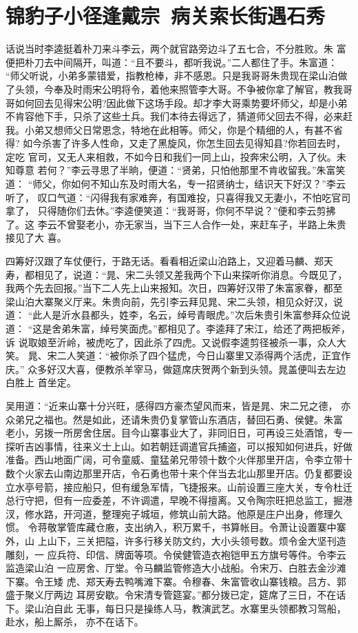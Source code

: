 \chapter{锦豹子小径逢戴宗~病关索长街遇石秀}

话说当时李逵挺着朴刀来斗李云，两个就官路旁边斗了五七合，不分胜败。朱
富便把朴刀去中间隔开，叫道：“且不要斗，都听我说。”二人都住了手。朱富道：
“师父听说，小弟多蒙错爱，指教枪棒，非不感恩。只是我哥哥朱贵现在梁山泊做
了头领，今奉及时雨宋公明将令，着他来照管李大哥。不争被你拿了解官，教我哥
哥如何回去见得宋公明?因此做下这场手段。却才李大哥乘势要坏师父，却是小弟
不肯容他下手，只杀了这些土兵。我们本待去得远了，猜道师父回去不得，必来赶
我。小弟又想师父日常恩念，特地在此相等。师父，你是个精细的人，有甚不省得?
如今杀害了许多人性命，又走了黑旋风，你怎生回去见得知县?你若回去时，定吃
官司，又无人来相救，不如今日和我们一同上山，投奔宋公明，入了伙。未知尊意
若何？”李云寻思了半晌，便道：“贤弟，只怕他那里不肯收留我。”朱富笑道：
“师父，你如何不知山东及时雨大名，专一招贤纳士，结识天下好汉？”李云听了，
叹口气道：“闪得我有家难奔，有国难投，只喜得我又无妻小，不怕吃官司拿了，
只得随你们去休。”李逵便笑道：“我哥哥，你何不早说？”便和李云剪拂了。这
李云不曾娶老小，亦无家当，当下三人合作一处，来赶车子，半路上朱贵接见了大
喜。

四筹好汉跟了车仗便行，于路无话。看看相近梁山泊路上，又迎着马麟、郑天
寿，都相见了，说道：“晁、宋二头领又差我两个下山来探听你消息。今既见了，
我两个先去回报。”当下二人先上山来报知。次日，四筹好汉带了朱富家眷，都至
梁山泊大寨聚义厅来。朱贵向前，先引李云拜见晁、宋二头领，相见众好汉，说道：
“此人是沂水县都头，姓李，名云，绰号青眼虎。”次后朱贵引朱富参拜众位说道：
“这是舍弟朱富，绰号笑面虎。”都相见了。李逵拜了宋江，给还了两把板斧，诉
说取娘至沂岭，被虎吃了，因此杀了四虎。又说假李逵剪径被杀一事，众人大笑。
晁、宋二人笑道：“被你杀了四个猛虎，今日山寨里又添得两个活虎，正宜作庆。”
众多好汉大喜，便教杀羊宰马，做筵席庆贺两个新到头领。晁盖便叫去左边白胜上
首坐定。

吴用道：“近来山寨十分兴旺，感得四方豪杰望风而来，皆是晁、宋二兄之德，
亦众弟兄之福也。然是如此，还请朱贵仍复掌管山东酒店，替回石勇、侯健。朱富
老小，另拨一所房舍住居。目今山寨事业大了，非同旧日，可再设三处酒馆，专一
探听吉凶事情，往来义士上山。如若朝廷调遣官兵捕盗，可以报知如何进兵，好做
准备。西山地面广阔，可令童威、童猛弟兄带领十数个火伴那里开店，令李立带十
数个火家去山南边那里开店，令石勇也带十来个伴当去北山那里开店。仍复都要设
立水亭号箭，接应船只，但有缓急军情，飞捷报来。山前设置三座大关，专令杜迁
总行守把，但有一应委差，不许调遣，早晚不得擅离。又令陶宗旺把总监工，掘港
汊，修水路，开河道，整理宛子城垣，修筑山前大路。他原是庄户出身，修理久惯。
令蒋敬掌管库藏仓廒，支出纳入，积万累千，书算帐目。令萧让设置寨中寨外，山
上山下，三关把隘，许多行移关防文约，大小头领号数。烦令金大坚刊造雕刻，一
应兵符、印信、牌面等项。令侯健管造衣袍铠甲五方旗号等件。令李云监造梁山泊
一应房舍、厅堂。令马麟监管修造大小战船。令宋万、白胜去金沙滩下寨。令王矮
虎、郑天寿去鸭嘴滩下寨。令穆春、朱富管收山寨钱粮。吕方、郭盛于聚义厅两边
耳房安歇。令宋清专管筵宴。”都分拨已定，筵席了三日，不在话下。梁山泊自此
无事，每日只是操练人马，教演武艺。水寨里头领都教习驾船，赴水，船上厮杀，
亦不在话下。

